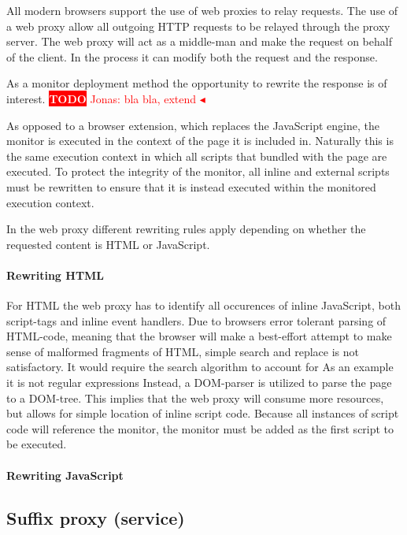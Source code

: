 \documentclass{llncs}
\newcommand{\todo}[1]{\colorbox{red}{\textcolor{white}{\sffamily\bfseries\scriptsize TODO}} \textcolor{red}{#1} \textcolor{red}{$\blacktriangleleft$}}
\begin{document}
All modern browsers support the use of web proxies to relay requests.
The use of a web proxy allow all outgoing HTTP requests to be 
relayed through the proxy server. The web proxy will act as a middle-man and make 
the request on behalf of the client. In the process it can modify both the 
request and the response. 

As a monitor deployment method the opportunity to rewrite the response is 
of interest. \todo{Jonas: bla bla, extend}

As opposed to a browser extension, which replaces the JavaScript engine, the 
monitor is executed in the context of the page it is included in. Naturally 
this is the same execution context in which all scripts that bundled with the 
page are executed. To protect the integrity of the monitor, all inline and 
external scripts must be rewritten to ensure that it is instead executed within the 
monitored execution context.

In the web proxy different rewriting rules apply depending on whether the 
requested content is HTML or JavaScript. 

\paragraph{Rewriting HTML}
For HTML the web proxy has to  identify all occurences of inline JavaScript, 
both script-tags and inline event handlers.
Due to browsers error tolerant parsing of HTML-code, meaning that the browser will make a best-effort attempt to make sense of malformed fragments of HTML,
simple search and replace is not satisfactory. It would require the search algorithm to account for 
As an example it is not regular expressions 
Instead, a DOM-parser is utilized 
to parse the page to a DOM-tree. This implies that the web proxy will consume more resources, but allows for simple location of inline script code.
Because all instances of script code will reference the monitor, the monitor must be added as the first script to be executed.


\paragraph{Rewriting JavaScript}

\subsection{Suffix proxy (service)}
\end{document}
